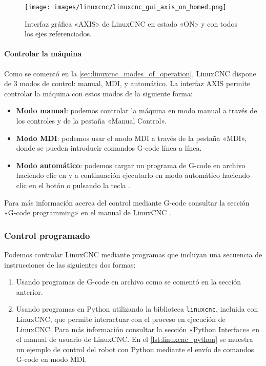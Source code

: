 \documentclass[english,spanish,a4paper,11pt]{article}
\begin{document}
\begin{figure}[!ht]
    \centering
    \texttt{[image: images/linuxcnc/linuxcnc\_gui\_axis\_on\_homed.png]}
    \caption{Interfaz gráfica «AXIS» de LinuxCNC en estado «ON» y con todos los ejes referenciados.}
    \label{fig:linuxcnc_gui_axis_on_homed}
\end{figure}


\paragraph{Controlar la máquina}\hfill\medskip

Como se comentó en la \cref{sec:linuxcnc_modes_of_operation}, LinuxCNC dispone de 3 modos de control: manual, \ac{MDI}, y automático. La interfaz AXIS permite controlar la máquina con estos modos de la siguiente forma:
\begin{itemize}
    \item \textbf{Modo manual}: podemos controlar la máquina en modo manual a través de los controles \button{-} y \button{+} de la pestaña «Manual Control».

    \item \textbf{Modo \acs{MDI}}: podemos usar el modo \ac{MDI} a través de la pestaña «MDI», donde se pueden introducir comandos G-code línea a línea.

    \item \textbf{Modo automático}: podemos cargar un programa de G-code en archivo haciendo clic en  y a continuación ejecutarlo en modo automático haciendo clic en el botón  o pulsando la tecla .
\end{itemize}

Para más información acerca del control mediante G-code consultar la sección «G-code programming» en el manual de LinuxCNC \cite{linuxcncdoc}.


\subsubsection{Control programado}

Podemos controlar LinuxCNC mediante programas que incluyan una secuencia de instrucciones de las siguientes dos formas:
%
\begin{enumerate}
    \item Usando programas de G-code en archivo como se comentó en la sección anterior.

    \item Usando programas en Python utilizando la biblioteca \texttt{linuxcnc}, incluida con LinuxCNC, que permite interactuar con el proceso en ejecución de LinuxCNC. Para más información consultar la sección «Python Interface» en el manual de usuario de LinuxCNC. En el \cref{lst:linuxcnc_python} se muestra un ejemplo de control del robot con Python mediante el envío de comandos G-code en modo \ac{MDI}.
\end{enumerate}
\end{document}
